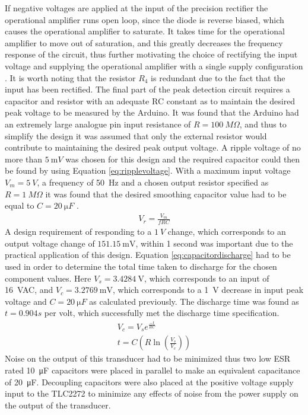 If negative voltages are applied at the input of the precision rectifier the operational amplifier runs open loop, since the diode is reverse biased, which causes the operational amplifier to saturate. It takes time for the operational amplifier to move out of saturation, and this greatly decreases the frequency response of the circuit, thus further motivating the choice of rectifying the input voltage and supplying the operational amplifier with a single supply configuration \cite{PrecisionRectifierSaturation}. It is worth noting that the resistor $R_4$ is redundant due to the fact that the input has been rectified. \vspace{4mm} \newline
The final part of the peak detection circuit requires a capacitor and resistor with an adequate RC constant as to maintain the desired peak voltage to be measured by the Arduino. It was found that the Arduino had an extremely large analogue pin input resistance of $R=\SI{100}{M\Omega}$, and thus to simplify the design it was assumed that only the external resistor would contribute to maintaining the desired peak output voltage. A ripple voltage of no more than $\SI{5}{\milli V}$ was chosen for this design and the required capacitor could then be found by using Equation \ref{eq:ripplevoltage}. With a maximum input voltage $V_{m}=\SI{5}{V}$, a frequency of \SI{50}{Hz} and a chosen output resistor specified as $R=\SI{1}{M\Omega}$ it was found that the desired smoothing capacitor value had to be equal to $C=\SI{20}{\micro F}$ \cite{Neaman:2018}.\newline
\begin{align}
  V_{r} = \frac{V_{m}}{fRC} 
   \label{eq:ripplevoltage}
\end{align}
A design requirement of responding to a $\SI{1}{V}$ change, which corresponds to an output voltage change of $\SI{151.15}{\milli \volt}$, within 1 second was important due to the practical application of this design. Equation \ref{eq:capacitordischarge} had to be used \cite{CapacitorDischarge} in order to determine the total time taken to discharge for the chosen component values. Here $V_{s}=\SI{3.4284}{\volt}$, which corresponds to an input of \SI{16}{VAC}, and $V_{c}=\SI{3.2769}{\milli \volt}$, which corresponds to a \SI{1}{V} decrease in input peak voltage and $C=\SI{20}{\micro F}$ as calculated previously. The discharge time was found as $t=0.904s$ per volt, which successfully met the discharge time specification. 
\begin{align}
  V_{c} = V_{s}e^{\frac{-t}{RC}} \nonumber \\
  t = C(R\ln(\frac{V_{s}}{V_{c}})) \label{eq:capacitordischarge}
\end{align}
Noise on the output of this transducer had to be minimized thus two low ESR rated \SI{10}{\micro F} capacitors were placed in parallel to make an equivalent capacitance of \SI{20}{\micro F}. Decoupling capacitors were also placed at the positive voltage supply input to the TLC2272 to minimize any effects of noise from the power supply on the output of the transducer.

